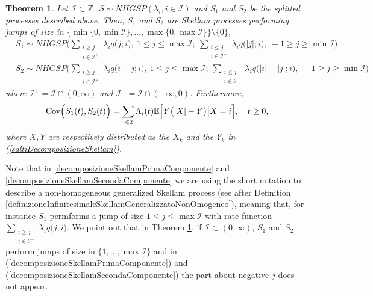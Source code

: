 \documentclass[12pt, twoside, english, headsepline]{article}
\newtheorem{theorem}{Theorem}[section] %
\theoremstyle{definition} %
\numberwithin{equation}{section} %
\begin{document}
\begin{theorem}\label{teoremaDecomposizioneSkellam}
	Let $\mathcal{I}\subset\mathbb{Z}$. $S\sim NHGSP (\lambda_i, i\in \mathcal{I} )$ and $S_1$ and $S_2$ be the splitted processes described above. Then, $S_1$ and $S_2$ are Skellam processes performing jumps of size in $\Big\{\min\big\{0,\min\mathcal{I}\big\},\dots, \max\big\{0,\max\mathcal{I}\big\}\Big\}\setminus \{0\}$,
	\begin{align}
		&S_1\sim NHGSP \Biggl(  \sum_{\substack{i\ge j\\i\in\mathcal{I}^+}}\lambda_i q\big(j;i\big),\ 1\le j\le \max\mathcal{I};\ \sum_{\substack{i\le j\\i\in\mathcal{I}^-}}\lambda_i q\big(|j|;i\big), \ -1\ge j\ge \min\mathcal{I} \Biggr) \label{decomposizioneSkellamPrimaComponente} \\
		&S_2\sim NHGSP \Biggl(  \sum_{\substack{i\ge j\\i\in\mathcal{I}^+}}\lambda_i q\big(i-j;i\big),\  1\le j\le \max\mathcal{I};\ \sum_{\substack{i\le j\\i\in\mathcal{I}^-}}\lambda_i q\big(|i|-|j|;i\big),\ -1\ge j\ge \min\mathcal{I} \Biggr) \label{decomposizioneSkellamSecondaComponente}
	\end{align}
	where $\mathcal{I}^+ = \mathcal{I}\cap(0,\infty)$ and $\mathcal{I}^- = \mathcal{I}\cap(-\infty,0)$.
	Furthermore, 
	\begin{equation}\label{covarianzaComponentiScomposizione}
		\text{Cov}\Big(S_1(t), S_2(t)\Big) = \sum_{i\in\mathcal{I}} \Lambda_i(t) \mathbb{E}\Bigl[Y\bigl(|X|-Y\big)\big|X=i\Bigr],\ \ \ t\ge0,
	\end{equation}
	where $X,Y$ are respectively distributed as the $X_k$ and the $Y_k$ in (\ref{saltiDecomposizioneSkellam}).
\end{theorem}

Note that in \eqref{decomposizioneSkellamPrimaComponente} and \eqref{decomposizioneSkellamSecondaComponente} we are using the short notation to describe a non-homogeneous generalized Skellam process (see after Definition \ref{definizioneInfinitesimaleSkellamGeneralizzatoNonOmogeneo}), meaning that, for instance $S_1$ permforms a jump of size $ 1\le j\le \max\mathcal{I}$ with rate function $\sum_{\substack{i\ge j\\i\in\mathcal{I}^+}}\lambda_i q\big(j;i\big)$.
We point out that in Theorem \ref{teoremaDecomposizioneSkellam}, if $\mathcal{I}\subset (0,\infty)$, $S_1$ and $S_2$ perform jumps of size in $\{1,\dots,\max\mathcal{I}\}$ and in (\ref{decomposizioneSkellamPrimaComponente}) and (\ref{decomposizioneSkellamSecondaComponente}) the part about negative $j$ does not appear.
\end{document}
